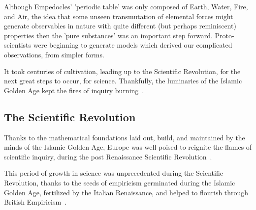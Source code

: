 Although Empedocles' 'periodic table' was only composed of Earth, Water, Fire,
and Air, the idea that some unseen transmutation of elemental forces might
generate observables in nature with quite different (but perhaps reminiscent)
properties then the 'pure substances' was an important step forward.
Proto-scientists were beginning to generate models which derived our complicated
observations, from simpler forms.

It took centuries of cultivation, leading up to the Scientific Revolution, for
the next great steps to occur, for science. Thankfully, the luminaries of the
Islamic Golden Age kept the fires of inquiry burning~\cite{Alexakos2005}.

\clearpage
\subsection{The Scientific Revolution}

Thanks to the mathematical foundations laid out, build, and maintained by the
minds of the Islamic Golden Age, Europe was well poised to reignite the flames
of scientific inquiry, during the post Renaissance Scientific
Revolution~\cite{Alexakos2005}.

This period of growth in science was unprecedented during the Scientific
Revolution, thanks to the seeds of empiricism germinated during the Islamic
Golden Age, fertilized by the Italian Renaissance, and helped to flourish
through British Empiricism~\cite{Cowley1968}.

